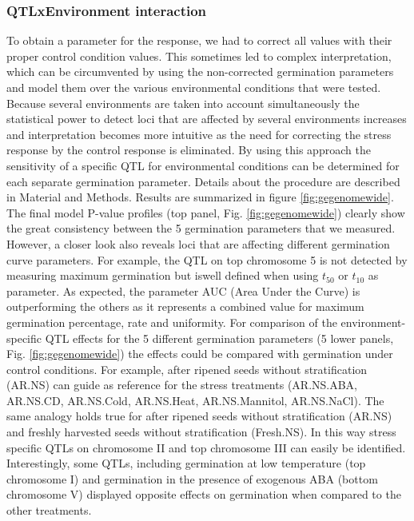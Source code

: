 \subsubsection{QTLxEnvironment interaction}
To obtain a parameter for the response, we had to correct all values with their proper control condition 
values. This sometimes led to complex interpretation, which can be circumvented by using the non-corrected 
germination parameters and model them over the various environmental conditions that were tested. Because 
several environments are taken into account simultaneously the statistical power to detect loci that are 
affected by several environments increases and interpretation becomes more intuitive as the need for 
correcting the stress response by the control response is eliminated. By using this approach the 
sensitivity of a specific QTL for environmental conditions can be determined for each separate germination 
parameter. Details about the procedure are described in Material and Methods. Results are summarized in 
figure \ref{fig:gegenomewide}. The final model P-value profiles (top panel, Fig. \ref{fig:gegenomewide}) clearly show the great consistency 
between the 5 germination parameters that we measured. However, a closer look also reveals loci that 
are affecting different germination curve parameters. For example, the QTL on top chromosome 5 is not 
detected by measuring maximum germination but iswell defined when using $t_{50}$ or $t_{10}$ as parameter. As 
expected, the parameter AUC (Area Under the Curve) is outperforming the others as it represents a 
combined value for maximum germination percentage, rate and uniformity. For comparison of the 
environment-specific QTL effects for the 5 different germination parameters (5 lower panels, Fig. \ref{fig:gegenomewide}) 
the effects could be compared with germination under control conditions. For example, after ripened 
seeds without stratification (AR.NS) can guide as reference for the stress treatments (AR.NS.ABA, AR.NS.CD, 
AR.NS.Cold, AR.NS.Heat, AR.NS.Mannitol, AR.NS.NaCl). The same analogy holds true for after ripened seeds
without stratification (AR.NS) and freshly harvested seeds without stratification (Fresh.NS). In this way 
stress specific QTLs on chromosome II and top chromosome III can easily be identified. Interestingly, some 
QTLs, including germination at low temperature (top chromosome I) and germination in the presence of 
exogenous ABA (bottom chromosome V) displayed opposite effects on germination when compared to the 
other treatments.

